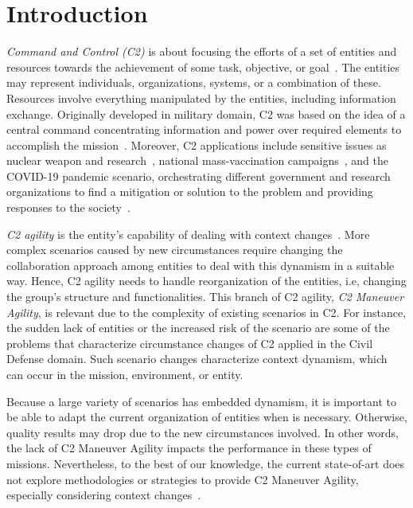 \section{Introduction}
\label{sec:introduction}


\textit{Command and Control (C2)} is about focusing the efforts of a set of entities and resources towards the achievement of some task, objective, or goal~\citep{CC02}. The entities may represent individuals, organizations, systems, or a combination of these. Resources involve everything manipulated by the entities, including information exchange. Originally developed in military domain, C2 was based on the idea of a central command concentrating information and power over required elements to accomplish the mission~\citep{CC01}. Moreover, C2 applications include sensitive issues as nuclear weapon and research~\citep{C2-EX2}, national mass-vaccination campaigns~\citep{C2-EX1}, and the COVID-19 pandemic scenario, orchestrating different government and research organizations to find a mitigation or solution to the problem and providing responses to the society~\citep{C2-EX3, C2-EX4, C2-EX5}.


\textit{C2 agility} is the entity's capability of dealing with context changes~\citep{france2014}. More complex scenarios caused by new circumstances require changing the collaboration approach among entities to deal with this dynamism in a suitable way. Hence, C2 agility needs to handle reorganization of the entities, i.e, changing the group's structure and functionalities. This branch of C2 agility, \textit{C2 Maneuver Agility}, is relevant due to the complexity of existing scenarios in C2. For instance, the sudden lack of entities or the increased risk of the scenario are some of the problems that characterize circumstance changes of C2 applied in the Civil Defense domain. Such scenario changes characterize context dynamism, which can occur in the mission, environment, or entity.


Because a large variety of scenarios has embedded dynamism, it is important to be able to adapt the current organization of entities when is necessary. Otherwise, quality results may drop due to the new circumstances involved. In other words, the lack of C2 Maneuver Agility impacts the performance in these types of missions. Nevertheless, to the best of our knowledge, the current state-of-art does not explore methodologies or strategies to provide C2 Maneuver Agility, especially considering context changes~\cite{france2014, futureC2}.

